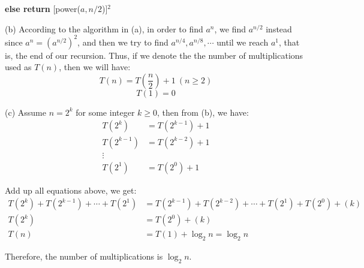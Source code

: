 \documentclass[a4paper,11pt]{article}
\begin{document}
\begin{spacing}{1.4}
    \textbf{else return} [power($a, n/2$)]$^2$

    \setlength{\parindent}{0em}

    \vspace{5pt}

    (b) According to the algorithm in (a), in order to find $a^n$,
    we find $a^{n/2}$ instead since $a^n=(a^{n/2})^2$,
    and then we try to find $a^{n/4}, a^{n/8}, \cdots$ until
    we reach $a^{1}$, that is, the end of our recursion.
    Thus, if we denote the the number of multiplications used as 
    $T(n)$, then we will have: 
    $$T(n)=T\left(\frac{n}{2}\right)+1\ (n\ge 2)$$
    $$T(1)=0$$

    \vspace{5pt}

    (c) Assume $n=2^k$ for some integer $k\ge 0$, then from (b), we have:
    \begin{align*}
        T(2^k)&=T(2^{k-1})+1\\
        T(2^{k-1})&=T(2^{k-2})+1\\
        \vdots\\
        T(2^1)&=T(2^{0})+1
    \end{align*}

    Add up all equations above, we get:
    \begin{align*}
        T(2^k)+T(2^{k-1})+\cdots + T(2^1)&=T(2^{k-1})+T(2^{k-2})+\cdots 
        + T(2^1)+T(2^0)+(k)\\
        T(2^k)&=T(2^0)+(k)\\
        T(n)&=T(1)+\log_2 n=\log_2 n
    \end{align*}

    Therefore, the number of multiplications is $\log_2 n$.



    
    \end{spacing}
\end{document}
